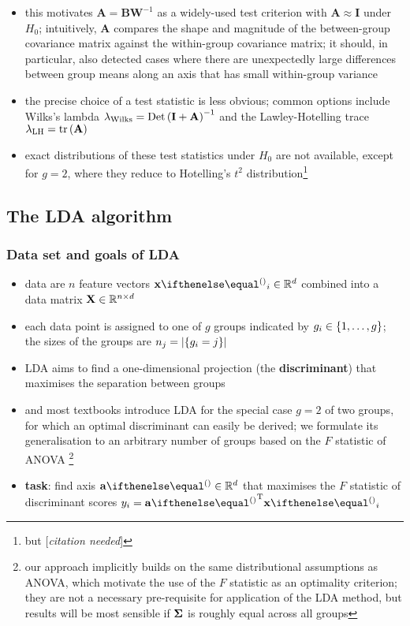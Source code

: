 \documentclass[a4paper]{article}
\begin{document}
\begin{itemize}
\item this motivates $\mathbf{A} = \mathbf{B} \mathbf{W}^{-1}$ as a widely-used test criterion with $\mathbf{A}\approx \mathbf{I}$ under $H_0$; intuitively, $\mathbf{A}$ compares the shape and magnitude of the between-group covariance matrix against the within-group covariance matrix; it should, in particular, also detected cases where there are unexpectedly large differences between group means along an axis that has small within-group variance
\item the precise choice of a test statistic is less obvious; common options include Wilks's lambda $\lambda_{\text{Wilks}} = \mathop{\text{Det}}\left(\mathbf{I} + \mathbf{A}\right)^{-1}$ and the Lawley-Hotelling trace $\lambda_{\text{LH}} = \mathop{\text{tr}}\left(\mathbf{A}\right)$
\item exact distributions of these test statistics under $H_0$ are not available, except for $g = 2$, where they reduce to Hotelling's $t^2$ distribution\footnote{but [\emph{citation needed}]}
\end{itemize}

\subsection{The LDA algorithm}
\label{sec:lda:standard}

\subsubsection{Data set and goals of LDA}
\label{sec:lda:standard:goals}

\begin{itemize}
\item data are $n$ feature vectors $\vx_i \in \setR^d$ combined into a data matrix $\mathbf{X}\in \mathbb{R}^{n\times d}$
\item each data point is assigned to one of $g$ groups indicated by $g_i\in \left\{1, \ldots, g\right\}$; the sizes of the groups are $n_j = \left\lvert\left\{g_i = j\right\}\right\rvert$
\item LDA aims to find a one-dimensional projection (the \textbf{discriminant}) that maximises the separation between groups
\item \citet{Fisher:36} and most textbooks introduce LDA for the special case $g = 2$ of two groups, for which an optimal discriminant can easily be derived; we formulate its generalisation to an arbitrary number of groups based on the $F$ statistic of ANOVA%
  \footnote{our approach implicitly builds on the same distributional assumptions as ANOVA, which motivate the use of the $F$ statistic as an optimality criterion; they are not a necessary pre-requisite for application of the LDA method, but results will be most sensible if $\boldsymbol{\Sigma}$ is roughly equal across all groups}
\item \textbf{task}: find axis $\va\in \setR^d$ that maximises the $F$ statistic of discriminant scores $y_i = \va\T \vx_i$
\end{itemize}
\end{document}
